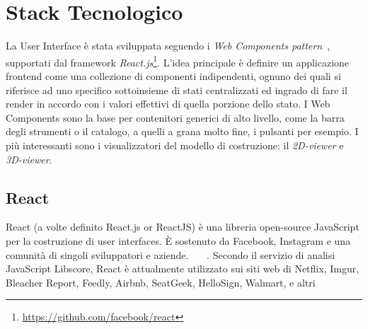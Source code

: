\section{Stack Tecnologico}
\label{sec:chapter_2_section_3}

La User Interface è stata sviluppata seguendo i \emph{Web Components pattern}~\cite{web_components},
supportati dal framework \emph{React.js}\footnote{\url{https://github.com/facebook/react}}.
L'idea principale è definire un applicazione frontend come una collezione di componenti indipendenti,
ognuno dei quali si riferisce ad uno specifico sottoinsieme di stati centralizzati ed ingrado
di fare il render in accordo con i valori effettivi di quella porzione dello stato.
I Web Components sono la base per contenitori generici di alto livello, come la barra degli strumenti o il catalogo,
a quelli a grana molto fine, i pulsanti per esempio. I più interessanti sono i visualizzatori del
modello di costruzione: il \emph{2D-viewer} e \emph{3D-viewer}.

%
\subsection{React}
\label{sec:chapter_2_section_3_sub_1}
React (a volte definito React.js or ReactJS) è una libreria open-source JavaScript per la costruzione di user interfaces.
\`E sostenuto da Facebook, Instagram e una comunità di singoli sviluppatori e aziende.
~\cite{infoworld}~\cite{facebookreact}~\cite{reactjs}. Secondo il servizio di analisi JavaScript Libscore, React è attualmente utilizzato sui
 siti web di Netflix, Imgur, Bleacher Report, Feedly, Airbnb, SeatGeek, HelloSign, Walmart, e altri~\cite{libscope}


